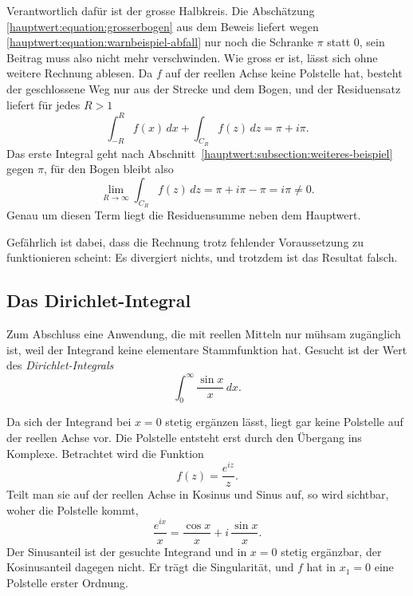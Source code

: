 Verantwortlich dafür ist der grosse Halbkreis.
Die Abschätzung \eqref{hauptwert:equation:grosserbogen} aus dem Beweis
liefert wegen \eqref{hauptwert:equation:warnbeispiel-abfall} nur noch die
Schranke $\pi$ statt $0$, sein Beitrag muss also nicht mehr verschwinden.
Wie gross er ist, lässt sich ohne weitere Rechnung ablesen.
Da $f$ auf der reellen Achse keine Polstelle hat, besteht der geschlossene
Weg nur aus der Strecke und dem Bogen, und der Residuensatz liefert für
jedes $R > 1$
\begin{equation}
  \int_{-R}^{R} f(x)\,dx
  +
  \int_{C_R} f(z)\,dz
  =
  \pi + i\pi .
  \label{hauptwert:equation:warnbeispiel-bilanz}
\end{equation}
Das erste Integral geht nach
Abschnitt~\ref{hauptwert:subsection:weiteres-beispiel} gegen $\pi$, für den
Bogen bleibt also
\begin{equation}
  \lim_{R \to \infty} \int_{C_R} f(z)\,dz
  =
  \pi + i\pi - \pi
  =
  i\pi
  \neq
  0 .
  \label{hauptwert:equation:warnbeispiel-bogen}
\end{equation}
Genau um diesen Term liegt die Residuensumme neben dem Hauptwert.

Gefährlich ist dabei, dass die Rechnung trotz fehlender Voraussetzung zu
funktionieren scheint:
Es divergiert nichts, und trotzdem ist das Resultat falsch.


\subsection{Das Dirichlet-Integral
\label{hauptwert:subsection:dirichlet}}

Zum Abschluss eine Anwendung, die mit reellen Mitteln nur mühsam zugänglich
ist, weil der Integrand keine elementare Stammfunktion hat.
Gesucht ist der Wert des \emph{Dirichlet-Integrals}
%
\begin{equation}
  \int_{0}^{\infty} \frac{\sin x}{x}\,dx .
  \label{hauptwert:equation:dirichlet}
\end{equation}

Da sich der Integrand bei $x = 0$ stetig ergänzen lässt, liegt gar keine
Polstelle auf der reellen Achse vor.
Die Polstelle entsteht erst durch den Übergang ins Komplexe.
Betrachtet wird die Funktion
\begin{equation}
  f(z) = \frac{e^{iz}}{z}.
\end{equation}
Teilt man sie auf der reellen Achse in Kosinus und Sinus auf, so wird
sichtbar, woher die Polstelle kommt,
\begin{equation}
  \frac{e^{ix}}{x} = \frac{\cos x}{x} + i\,\frac{\sin x}{x} .
  \label{hauptwert:equation:dirichlet-zerlegen}
\end{equation}
Der Sinusanteil ist der gesuchte Integrand und in $x = 0$ stetig ergänzbar,
der Kosinusanteil dagegen nicht.
Er trägt die Singularität, und $f$ hat in $x_1 = 0$ eine Polstelle erster
Ordnung.


